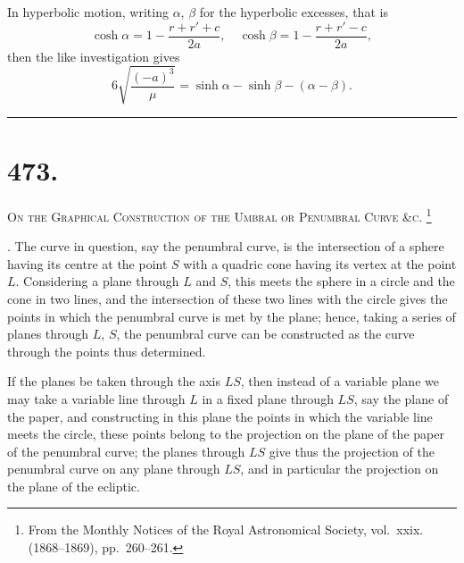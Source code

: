 \documentclass[11pt,a4paper]{article}
\theoremstyle{definition}
\begin{document}
In hyperbolic motion, writing $\alpha$, $\beta$ for the hyperbolic excesses, that is
\[
\cosh\alpha = 1 - \frac{r+r'+c}{2a}, \quad
\cosh\beta = 1 - \frac{r+r'-c}{2a},
\]
then the like investigation gives
\[
6\sqrt{\frac{(-a)^3}{\mu}} = \sinh\alpha - \sinh\beta - (\alpha - \beta).
\]

\hfill\rule{1.5cm}{0.4pt}

\newpage

\section*{473.}
\markboth{ON THE CONSTRUCTION OF THE UMBRAL OR PENUMBRAL CURVE \&C.}{473]}

\noindent\textsc{On the Graphical Construction of the Umbral or Penumbral
Curve \&c.}%
\footnote{From the Monthly Notices of the Royal Astronomical Society, vol.~xxix. (1868--1869), pp.~260--261.}

\smallskip

. The curve in question, say the penumbral curve, is the intersection of a sphere
having its centre at the point $S$ with a quadric cone having its vertex at the point $L$.
Considering a plane through $L$ and $S$, this meets the sphere in a circle and the cone in
two lines, and the intersection of these two lines with the circle gives the points in
which the penumbral curve is met by the plane; hence, taking a series of planes through
$L$, $S$, the penumbral curve can be constructed as the curve through the points thus
determined.

If the planes be taken through the axis $LS$, then instead of a variable plane we
may take a variable line through $L$ in a fixed plane through $LS$, say the plane of the
paper, and constructing in this plane the points in which the variable line meets the
circle, these points belong to the projection on the plane of the paper of the penumbral
curve; the planes through $LS$ give thus the projection of the penumbral curve on any
plane through $LS$, and in particular the projection on the plane of the ecliptic.
\end{document}
